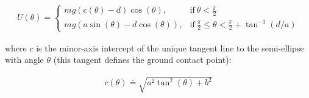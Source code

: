 \documentclass[letterpaper]{report}
\begin{document}
\begin{align}
  U(\theta) =
    \begin{cases}
      mg (c(\theta)-d) \cos(\theta), & \text{if}\ \theta < \frac{\pi}{2} \\
      mg (a \sin(\theta) - d \cos(\theta) ), & \text{if}\ \frac{\pi}{2} \leq \theta < \frac{\pi}{2} + \tan^{-1}(d/a)
    \end{cases}
  \label{eq:QSEnergy}
\end{align}

where $c$ is the minor-axis intercept of the unique tangent line to the semi-ellipse with angle $\theta$ (this tangent defines the ground contact point):

\begin{align}
  c(\theta) \doteq \sqrt{a^2 \tan^2(\theta) + b^2}
\end{align}
\end{document}
